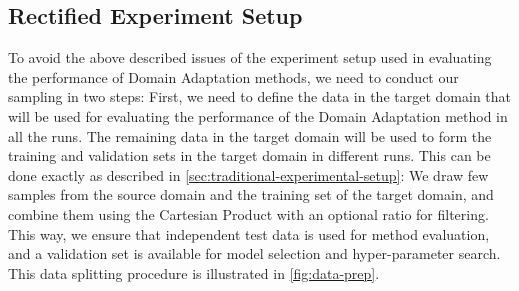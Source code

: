 \documentclass[journal]{IEEEtran}
\begin{document}
\subsection{Rectified Experiment Setup}\label{sec:rectified-experimental-setup}
To avoid the above described issues of the experiment setup used in evaluating the performance of Domain Adaptation methods, we need to conduct our sampling in two steps: First, we need to define the data in the target domain that will be used for evaluating the performance of the Domain Adaptation method in all the runs. The remaining data in the target domain will be used to form the training and validation sets in the target domain in different runs. This can be done exactly as described in \cref{sec:traditional-experimental-setup}: We draw few samples from the source domain and the training set of the target domain, and combine them using the Cartesian Product with an optional ratio for filtering. This way, we ensure that independent test data is used for method evaluation, and a validation set is available for model selection and hyper-parameter search. This data splitting procedure is illustrated in \cref{fig:data-prep}.
\end{document}
